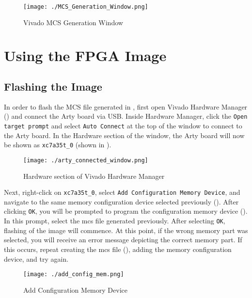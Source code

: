 \begin{figure}[h!tbp]
  \centering
  \texttt{[image: ./MCS\_Generation\_Window.png]}
  \caption{Vivado MCS Generation Window}
  \label{fig:Vivado_MCS_Window}
\end{figure}

\section{Using the FPGA Image}\label{sec:Using_FPGA_Image}
\subsection{Flashing the Image}\label{sec:Flash_FPGA_Image}
In order to flash the MCS file generated in , first open Vivado Hardware Manager () and connect the Arty board via USB.
Inside Hardware Manager, click the \texttt{Open target prompt} and select \texttt{Auto Connect} at the top of the window to connect to the Arty board.
In the Hardware section of the window, the Arty board will now be shown as \texttt{xc7a35t\_0} (shown in ).

\begin{figure}[h!tbp]
  \centering
  \texttt{[image: ./arty\_connected\_window.png]}
  \caption{Hardware section of Vivado Hardware Manager}
  \label{fig:Vivado_HW_connected}
\end{figure}

Next, right-click on \texttt{xc7a35t\_0}, select \texttt{Add Configuration Memory Device}, and navigate to the same memory configuration device selected previously ().
After clicking \texttt{OK}, you will be prompted to program the configuration memory device ().
In this prompt, select the \Gls{mcs} file generated previously.
After selecting \texttt{OK}, flashing of the image will commence.
At this point, if the wrong memory part was selected, you will receive an error message depicting the correct memory part.
If this occurs, repeat creating the \Gls{mcs} file (), adding the memory configuration device, and try again.

\begin{figure}[h!tbp]
  \centering
  \texttt{[image: ./add\_config\_mem.png]}
  \caption{Add Configuration Memory Device}
  \label{fig:add_config_mem}
\end{figure}

